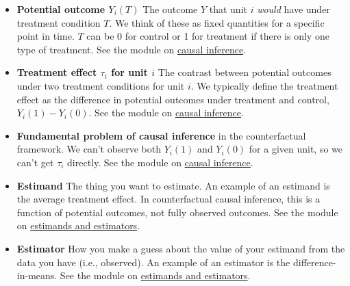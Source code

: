 \documentclass[12pt,]{book}
\providecommand{\tightlist}{%
  \setlength{\itemsep}{0pt}\setlength{\parskip}{0pt}}
\begin{document}
\begin{itemize}
\tightlist
\item
  \textbf{Potential outcome \(Y_i(T)\)} The outcome \(Y\) that unit \(i\) \emph{would}
  have under treatment condition \(T\). We think of these as fixed quantities for a specific point in time. \(T\) can be 0 for control or 1 for treatment if there is only one type of treatment. See the module on \href{causal-inference.html}{causal inference}.
\item
  \textbf{Treatment effect \(\tau_i\) for unit \(i\)} The contrast between potential
  outcomes under two treatment conditions for unit \(i\). We typically define the treatment effect as the difference in potential outcomes under treatment and control, \(Y_i(1)-Y_i(0)\). See the module on \href{causal-inference.html}{causal inference}.
\item
  \textbf{Fundamental problem of causal inference} in the counterfactual framework. We can't observe both \(Y_i(1)\) and \(Y_i(0)\) for a given unit, so we can't get \(\tau_i\) directly. See the module on \href{causal-inference.html}{causal inference}.
\item
  \textbf{Estimand} The thing you want to estimate. An example of an estimand is the average treatment effect. In counterfactual causal inference, this is a function of potential outcomes, not fully observed outcomes. See the module on \href{estimands-and-estimators.html}{estimands and estimators}.
\item
  \textbf{Estimator} How you make a guess about the value of your estimand from the
  data you have (i.e., observed). An example of an estimator is the difference-in-means. See the module on \href{estimands-and-estimators.html}{estimands and estimators}.


\end{itemize}
\end{document}
